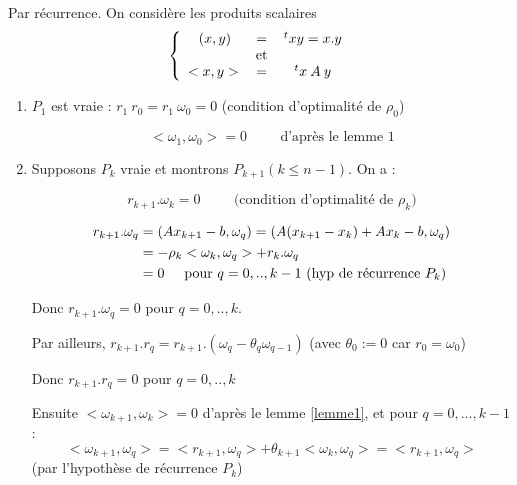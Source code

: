 \begin{preuve}
    Par récurrence. On considère les produits scalaires 
    \[
        \left\lbrace
        \begin{array}{ccc}
            (x,y) & = & \,^txy = x.y \\
            & \text{et} & \\
            <x,y> \: & = & \,^tx \: A \: y
        \end{array}
        \right.
    \]

    \begin{enumerate}[label=•]
        \item $P_1$ est vraie : $r_1 \: r_0 = r_1 \: \omega_0 = 0$ (condition d'optimalité de $\rho_0$)

            \[
                < \omega_1 , \omega_0 > = 0 \hspace{1cm} \text{d'après le lemme 1}
            \]

        \item Supposons $P_k$ vraie et montrons $P_{k+1} (k \leq n-1)$. On a :

            \[
                r_{k+1}.\omega_k = 0 \hspace{1cm} \text{(condition d'optimalité de $\rho_k$)}
            \]

            \begin{align*}
                r_{k+1}.\omega_q & = (Ax_{k+1} - b, \omega_q) = \left(A(x_{k+1} - x_k) + Ax_k - b, \omega_q \right) \\
                & = - \rho_k <\omega_k,\omega_q> + r_k . \omega_q \\
                & = 0 \hspace{0.5cm} \text{pour $q=0,..,k-1$ (hyp de récurrence $P_k$)}
            \end{align*}

            Donc $r_{k+1}.\omega_q = 0$ pour $q=0,..,k$.

            Par ailleurs, $r_{k+1}.r_q = r_{k+1}.(\omega_q - \theta_q \omega_{q-1})$ \hspace{0.3cm} (avec $\theta_0 := 0$ car $r_0 = \omega_0$)

            \vspace{0.4cm}
            Donc $r_{k+1}.r_q = 0$ pour $q=0,..,k$

            \vspace{0.4cm}
            Ensuite $<\omega_{k+1},\omega_k> = 0$ d'après le lemme \ref{lemme1}, et pour
            $q=0,\dots,k-1$ :
            \[
                <\omega_{k+1},\omega_q> = <r_{k+1},\omega_q> + \theta_{k+1} <\omega_k,\omega_q> = <r_{k+1},\omega_q>
            \]
            (par l'hypothèse de récurrence $P_k$)


\end{enumerate}
\end{preuve}
